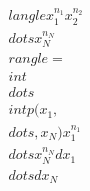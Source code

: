 \documentclass[preview]{standalone}
\begin{document}
\begin{align*}
\quad\\langle x_1^{n_1} x_2^{n_2} \quad\\dots x_N^{n_N} \quad\\rangle = \quad\\int \quad\\dots \quad\\int p(x_1, \quad\\dots, x_N) x_1^{n_1} \quad\\dots x_N^{n_N} dx_1 \quad\\dots dx_N
\end{align*}
\end{document}
